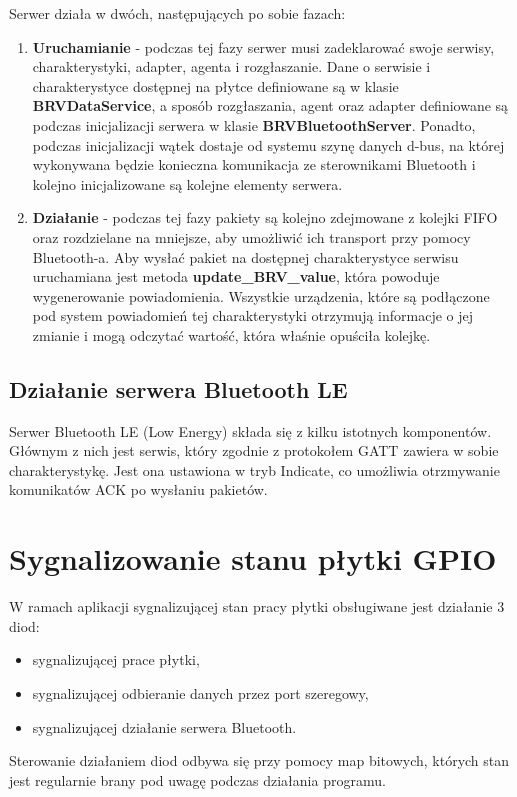     Serwer działa w dwóch, następujących po sobie fazach:
    \begin{enumerate}
        \item{\textbf{Uruchamianie} - podczas tej fazy serwer musi zadeklarować swoje 
        serwisy, charakterystyki, adapter, agenta i rozgłaszanie. Dane o serwisie i 
        charakterystyce dostępnej na płytce definiowane są w klasie \textbf{BRVDataService}, 
        a sposób rozgłaszania, agent oraz adapter definiowane są podczas 
        inicjalizacji serwera w klasie \textbf{BRVBluetoothServer}. Ponadto, podczas 
        inicjalizacji wątek dostaje od systemu szynę danych d-bus, na której wykonywana 
        będzie konieczna komunikacja ze sterownikami Bluetooth i kolejno 
        inicjalizowane są kolejne elementy serwera.}
        \item{\textbf{Działanie} - podczas tej fazy pakiety są kolejno zdejmowane z 
        kolejki FIFO oraz rozdzielane na mniejsze, aby umożliwić ich transport przy 
        pomocy Bluetooth-a. Aby wysłać pakiet na dostępnej charakterystyce serwisu 
        uruchamiana jest metoda \textbf{update\_BRV\_value}, która powoduje 
        wygenerowanie powiadomienia. Wszystkie urządzenia, które są podłączone 
        pod system powiadomień tej charakterystyki otrzymują informacje o jej 
        zmianie i mogą odczytać wartość, która właśnie opuściła kolejkę.}
    \end{enumerate}

    \subsection{Działanie serwera Bluetooth LE}
    Serwer Bluetooth LE (Low Energy) składa się z kilku istotnych komponentów. 
    Głównym z nich jest serwis, który zgodnie z protokołem GATT zawiera w sobie 
    charakterystykę. Jest ona ustawiona w tryb Indicate, co umożliwia otrzmywanie 
    komunikatów ACK po wysłaniu pakietów.
    
    \section {Sygnalizowanie stanu płytki GPIO}
    W ramach aplikacji sygnalizującej stan pracy płytki obsługiwane jest działanie 
    3 diod:
    \begin{itemize}
        \item sygnalizującej prace płytki,
        \item sygnalizującej odbieranie danych przez port szeregowy,
        \item sygnalizującej działanie serwera Bluetooth.
    \end{itemize}
    Sterowanie działaniem diod odbywa się przy pomocy map bitowych, których stan 
    jest regularnie brany pod uwagę podczas działania programu.
    
